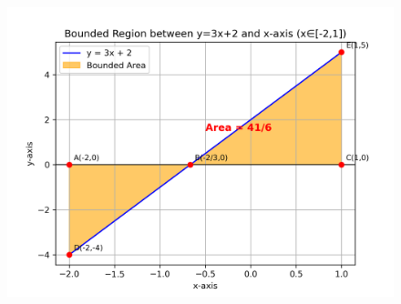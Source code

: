 \documentclass[journal]{IEEEtran}
\begin{document}
\\ \\ \\ \\ \\ \\
\begin{figure}[H]
    \centering
    \includegraphics[width=0.96\columnwidth]{figs/01.png}
    \label{fig-1}
\end{figure}
\end{document}
